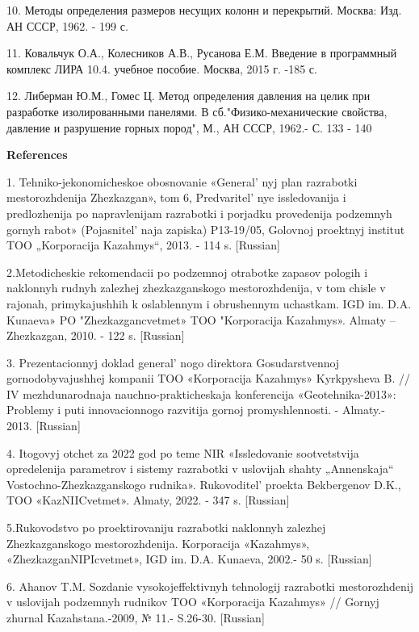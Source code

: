 \begin{references}
10. Методы определения размеров несущих колонн и перекрытий. Москва:
Изд. АН СССР, 1962. - 199 с.

11. Ковальчук О.А., Колесников А.В., Русанова Е.М. Введение в
программный комплекс ЛИРА 10.4. учебное пособие. Москва, 2015 г. -185 с.

12. Либерман Ю.М., Гомес Ц. Метод определения давления на целик при
разработке изолированными панелями. В сб."Физико-механические свойства,
давление и разрушение горных пород", М., АН СССР, 1962.- С. 133 - 140
\end{references}

\begin{center}
{\bfseries References}
\end{center}

\begin{references}

1. Tehniko-jekonomicheskoe obosnovanie «General' nyj plan
razrabotki mestorozhdenija Zhezkazgan», tom 6,
Predvaritel' nye issledovanija i predlozhenija po
napravlenijam razrabotki i porjadku provedenija podzemnyh gornyh rabot»
(Pojasnitel' naja zapiska) P13-19/05, Golovnoj proektnyj
institut TOO „Korporacija Kazahmys``, 2013. - 114 s. {[}Russian{]}

2.Metodicheskie rekomendacii po podzemnoj otrabotke zapasov pologih i
naklonnyh rudnyh zalezhej zhezkazganskogo mestorozhdenija, v tom chisle
v rajonah, primykajushhih k oslablennym i obrushennym uchastkam. IGD im.
D.A. Kunaeva» PO "Zhezkazgancvetmet» TOO "Korporacija Kazahmys». Almaty
-- Zhezkazgan, 2010. - 122 s. {[}Russian{]}

3. Prezentacionnyj doklad general' nogo direktora
Gosudarstvennoj gornodobyvajushhej kompanii TOO «Korporacija Kazahmys»
Kyrkpysheva B. // IV mezhdunarodnaja nauchno-prakticheskaja konferencija
«Geotehnika-2013»: Problemy i puti innovacionnogo razvitija gornoj
promyshlennosti. - Almaty.- 2013. {[}Russian{]}

4. Itogovyj otchet za 2022 god po teme NIR «Issledovanie sootvetstvija
opredelenija parametrov i sistemy razrabotki v uslovijah shahty
„Annenskaja`` Vostochno-Zhezkazganskogo rudnika».
Rukovoditel'{} proekta Bekbergenov D.K., TOO
«KazNIICvetmet». Almaty, 2022. - 347 s. {[}Russian{]}

5.Rukovodstvo po proektirovaniju razrabotki naklonnyh zalezhej
Zhezkazganskogo mestorozhdenija. Korporacija «Kazahmys»,
«ZhezkazganNIPIcvetmet», IGD im. D.A. Kunaeva, 2002.- 50 s.
{[}Russian{]}

6. Ahanov T.M. Sozdanie vysokojeffektivnyh tehnologij razrabotki
mestorozhdenij v uslovijah podzemnyh rudnikov TOO «Korporacija Kazahmys»
// Gornyj zhurnal Kazahstana.-2009, № 11.- S.26-30. {[}Russian{]}


\end{references}
